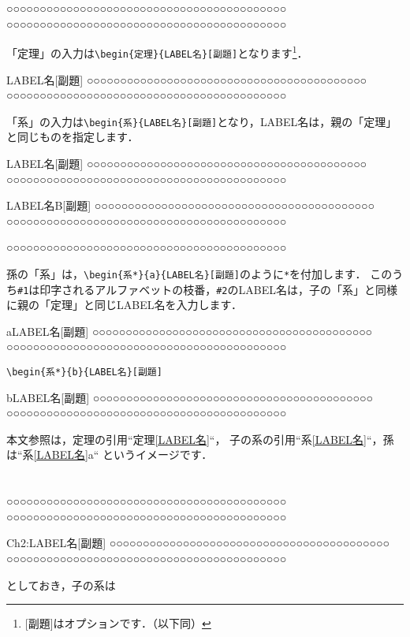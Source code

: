 \documentclass[dvipdfmx,VUP,useotf,usehyperref]{CoreCourseMath}
\begin{document}
\setcounter{chapter}{1}
\begin{命題}
○○○○○○○○○○○○○○○○○○○○○○○○○○○○○○○○○○○○○○○○○○
○○○○○○○○○○○○○○○○○○○○○○○○○○○○○○○○○○○○○○○○○○
\end{命題}
「定理」の入力は\verb|\begin{定理}{LABEL名}[副題]|となります\footnote{\textsf{[副題]}はオプションです．（以下同）}．
\begin{定理}{LABEL名}[副題]
○○○○○○○○○○○○○○○○○○○○○○○○○○○○○○○○○○○○○○○○○○
○○○○○○○○○○○○○○○○○○○○○○○○○○○○○○○○○○○○○○○○○○
\end{定理}
「系」の入力は\verb|\begin{系}{LABEL名}[副題]|となり，\textsf{LABEL名}は，親の「定理」と同じものを指定します．
\begin{系}{LABEL名}[副題]
○○○○○○○○○○○○○○○○○○○○○○○○○○○○○○○○○○○○○○○○○○
○○○○○○○○○○○○○○○○○○○○○○○○○○○○○○○○○○○○○○○○○○
\end{系}
\begin{定理}{LABEL名B}[副題]
○○○○○○○○○○○○○○○○○○○○○○○○○○○○○○○○○○○○○○○○○○
○○○○○○○○○○○○○○○○○○○○○○○○○○○○○○○○○○○○○○○○○○
\end{定理}

\begin{補題}
○○○○○○○○○○○○○○○○○○○○○○○○○○○○○○○○○○○○○○○○○○
\end{補題}
孫の「系」は，\verb|\begin{系*}{a}{LABEL名}[副題]|のように\verb+*+を付加します．
このうち\verb|#1|は印字されるアルファベットの枝番，\verb|#2|の\textsf{LABEL名}は，子の「系」と同様に親の「定理」と同じ\textsf{LABEL名}を入力します．
\begin{系*}{a}{LABEL名}[副題]
○○○○○○○○○○○○○○○○○○○○○○○○○○○○○○○○○○○○○○○○○○
○○○○○○○○○○○○○○○○○○○○○○○○○○○○○○○○○○○○○○○○○○
\end{系*}
\verb|\begin{系*}{b}{LABEL名}[副題]|
\begin{系*}{b}{LABEL名}[副題]
○○○○○○○○○○○○○○○○○○○○○○○○○○○○○○○○○○○○○○○○○○
○○○○○○○○○○○○○○○○○○○○○○○○○○○○○○○○○○○○○○○○○○
\end{系*}
本文参照は，定理の引用``定理\ref{LABEL名}``，
子の系の引用``系\ref{LABEL名}``，孫は``系\ref{LABEL名}a`` というイメージです．
\chapter{}

\begin{命題}
○○○○○○○○○○○○○○○○○○○○○○○○○○○○○○○○○○○○○○○○○○
○○○○○○○○○○○○○○○○○○○○○○○○○○○○○○○○○○○○○○○○○○
\end{命題}
\begin{定理}{Ch2:LABEL名}[副題]
○○○○○○○○○○○○○○○○○○○○○○○○○○○○○○○○○○○○○○○○○○
○○○○○○○○○○○○○○○○○○○○○○○○○○○○○○○○○○○○○○○○○○
\end{定理}
としておき，子の系は
\end{document}
